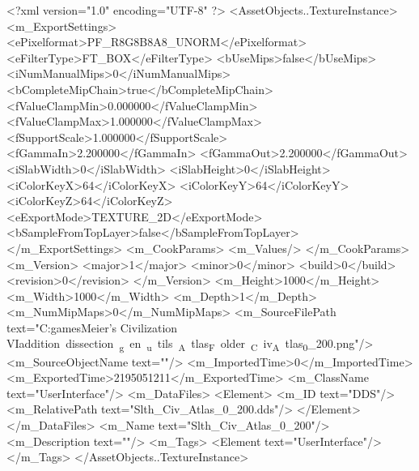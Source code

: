 <?xml version="1.0" encoding="UTF-8" ?>
<AssetObjects..TextureInstance>
	<m_ExportSettings>
		<ePixelformat>PF_R8G8B8A8_UNORM</ePixelformat>
		<eFilterType>FT_BOX</eFilterType>
		<bUseMips>false</bUseMips>
		<iNumManualMips>0</iNumManualMips>
		<bCompleteMipChain>true</bCompleteMipChain>
		<fValueClampMin>0.000000</fValueClampMin>
		<fValueClampMax>1.000000</fValueClampMax>
		<fSupportScale>1.000000</fSupportScale>
		<fGammaIn>2.200000</fGammaIn>
		<fGammaOut>2.200000</fGammaOut>
		<iSlabWidth>0</iSlabWidth>
		<iSlabHeight>0</iSlabHeight>
		<iColorKeyX>64</iColorKeyX>
		<iColorKeyY>64</iColorKeyY>
		<iColorKeyZ>64</iColorKeyZ>
		<eExportMode>TEXTURE_2D</eExportMode>
		<bSampleFromTopLayer>false</bSampleFromTopLayer>
	</m_ExportSettings>
	<m_CookParams>
		<m_Values/>
	</m_CookParams>
	<m_Version>
		<major>1</major>
		<minor>0</minor>
		<build>0</build>
		<revision>0</revision>
	</m_Version>
	<m_Height>1000</m_Height>
	<m_Width>1000</m_Width>
	<m_Depth>1</m_Depth>
	<m_NumMipMaps>0</m_NumMipMaps>
	<m_SourceFilePath text="C:\Users\Sam\Documents\my games\Sid Meier's Civilization VI\Mods\unit addition dissection\python_gen\build_utils\CIV_Atlas_Folder\Slth_Civ_Atlas_0_200.png"/>
	<m_SourceObjectName text=""/>
	<m_ImportedTime>0</m_ImportedTime>
	<m_ExportedTime>2195051211</m_ExportedTime>
	<m_ClassName text="UserInterface"/>
	<m_DataFiles>
		<Element>
			<m_ID text="DDS"/>
			<m_RelativePath text="Slth_Civ_Atlas_0_200.dds"/>
		</Element>
	</m_DataFiles>
	<m_Name text="Slth_Civ_Atlas_0_200"/>
	<m_Description text=""/>
	<m_Tags>
		<Element text="UserInterface"/>
	</m_Tags>
</AssetObjects..TextureInstance>

